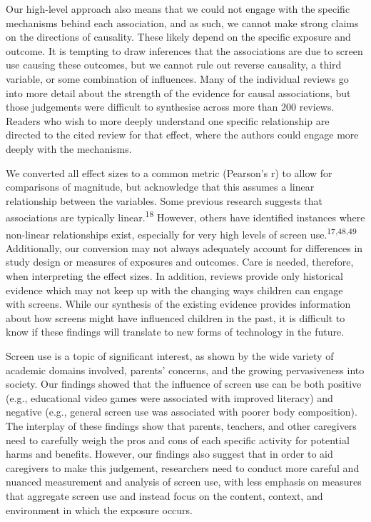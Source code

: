 \documentclass[
  english,
  man]{apa6}
\begin{document}
Our high-level approach also means that we could not engage with the specific mechanisms behind each association, and as such, we cannot make strong claims on the directions of causality.
These likely depend on the specific exposure and outcome.
It is tempting to draw inferences that the associations are due to screen use causing these outcomes, but we cannot rule out reverse causality, a third variable, or some combination of influences.
Many of the individual reviews go into more detail about the strength of the evidence for causal associations, but those judgements were difficult to synthesise across more than 200 reviews.
Readers who wish to more deeply understand one specific relationship are directed to the cited review for that effect, where the authors could engage more deeply with the mechanisms.

We converted all effect sizes to a common metric (Pearson's r) to allow for comparisons of magnitude, but acknowledge that this assumes a linear relationship between the variables.
Some previous research suggests that associations are typically linear.\textsuperscript{18}
However, others have identified instances where non-linear relationships exist, especially for very high levels of screen use.\textsuperscript{17,48,49}
Additionally, our conversion may not always adequately account for differences in study design or measures of exposures and outcomes.
Care is needed, therefore, when interpreting the effect sizes.
In addition, reviews provide only historical evidence which may not keep up with the changing ways children can engage with screens.
While our synthesis of the existing evidence provides information about how screens might have influenced children in the past, it is difficult to know if these findings will translate to new forms of technology in the future.

Screen use is a topic of significant interest, as shown by the wide variety of academic domains involved, parents' concerns, and the growing pervasiveness into society.
Our findings showed that the influence of screen use can be both positive (e.g., educational video games were associated with improved literacy) and negative (e.g., general screen use was associated with poorer body composition).
The interplay of these findings show that parents, teachers, and other caregivers need to carefully weigh the pros and cons of each specific activity for potential harms and benefits.
However, our findings also suggest that in order to aid caregivers to make this judgement, researchers need to conduct more careful and nuanced measurement and analysis of screen use, with less emphasis on measures that aggregate screen use and instead focus on the content, context, and environment in which the exposure occurs.
\end{document}
